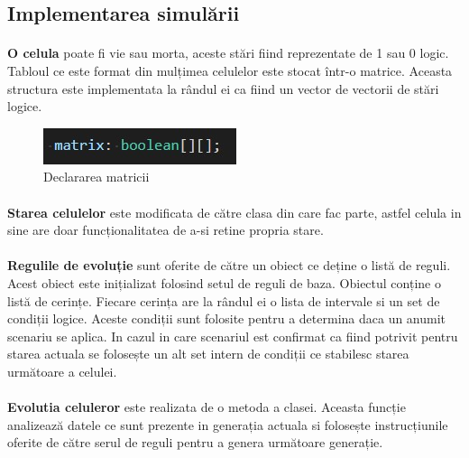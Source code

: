 \documentclass[11pt ,A4]{article}
\begin{document}
        \subsection{Implementarea simulării}
            \paragraph{}
                \textbf{O celula} poate fi vie sau morta, aceste stări fiind reprezentate de 1 sau 0 logic.
                Tabloul ce este format din mulțimea celulelor este stocat într-o matrice. Aceasta structura este implementata la rândul ei ca fiind un vector de vectorii de stări logice. 
                \begin{figure}[h]
                    \centering
                    \includegraphics[scale=0.8]{matrix_matrix_def}
                    \caption{Declararea matricii}
                \end{figure}

            \paragraph{}
                \textbf{Starea celulelor} este modificata de către clasa din care fac parte, astfel celula in sine are doar funcționalitatea de a-si retine propria stare.

            \paragraph{}
                \textbf{Regulile de evoluție} sunt oferite de către un obiect ce deține o listă de reguli.
                Acest obiect este inițializat folosind setul de reguli de baza. Obiectul conține o listă de cerințe.
                Fiecare cerința are la rândul ei o lista de intervale si un set de condiții logice.
                Aceste condiții sunt folosite pentru a determina daca un anumit scenariu se aplica.
                In cazul in care scenariul est confirmat ca fiind potrivit pentru starea actuala se folosește un alt set intern de condiții ce stabilesc starea următoare a celulei.
            
            \paragraph{}
                \textbf{Evolutia celuleror} este realizata de o metoda a clasei.
                Aceasta funcție analizează datele ce sunt prezente in generația actuala si folosește instrucțiunile oferite de către serul de reguli pentru a genera următoare generație.
\end{document}
